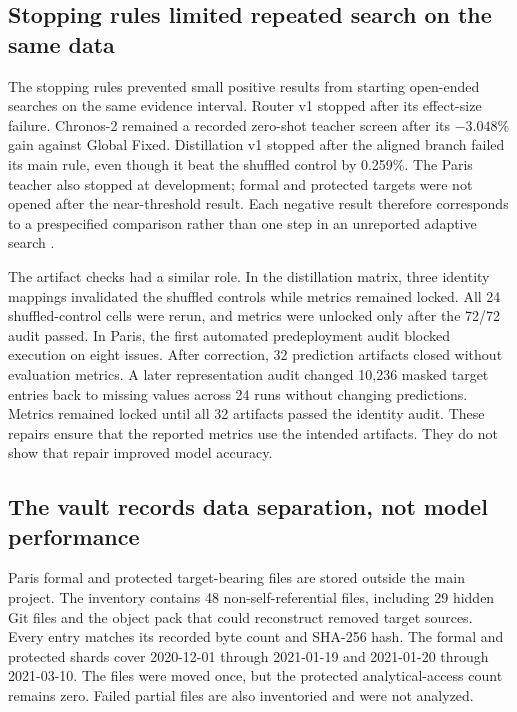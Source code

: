 \subsection{Stopping rules limited repeated search on the same data}

The stopping rules prevented small positive results from starting open-ended searches on the same evidence interval.  Router v1 stopped after its effect-size failure.  Chronos-2 remained a recorded zero-shot teacher screen after its $-3.048\%$ gain against Global Fixed.  Distillation v1 stopped after the aligned branch failed its main rule, even though it beat the shuffled control by 0.259\%.  The Paris teacher also stopped at development; formal and protected targets were not opened after the near-threshold result.  Each negative result therefore corresponds to a prespecified comparison rather than one step in an unreported adaptive search \cite{cawley2010selectionbias,dwork2015reusableholdout}.

The artifact checks had a similar role.  In the distillation matrix, three identity mappings invalidated the shuffled controls while metrics remained locked.  All 24 shuffled-control cells were rerun, and metrics were unlocked only after the 72/72 audit passed.  In Paris, the first automated predeployment audit blocked execution on eight issues.  After correction, 32 prediction artifacts closed without evaluation metrics.  A later representation audit changed 10,236 masked target entries back to missing values across 24 runs without changing predictions.  Metrics remained locked until all 32 artifacts passed the identity audit.  These repairs ensure that the reported metrics use the intended artifacts.  They do not show that repair improved model accuracy.

\subsection{The vault records data separation, not model performance}

Paris formal and protected target-bearing files are stored outside the main project.  The inventory contains 48 non-self-referential files, including 29 hidden Git files and the object pack that could reconstruct removed target sources.  Every entry matches its recorded byte count and SHA-256 hash.  The formal and protected shards cover 2020-12-01 through 2021-01-19 and 2021-01-20 through 2021-03-10.  The files were moved once, but the protected analytical-access count remains zero.  Failed partial files are also inventoried and were not analyzed.

